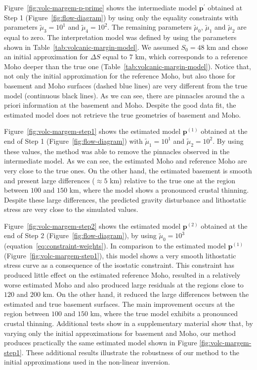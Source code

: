 \documentclass[manuscript]{geophysics}
\begin{document}
Figure~\ref{fig:volc-margem-p-prime} shows the intermediate model 
$\mathbf{p}^{\prime}$ obtained at Step 1 (Figure~\ref{fig:flow-diagram})
by using only the equality constraints with parameters
$\tilde{\mu}_{3} = 10^{1}$ and $\tilde{\mu}_{4} = 10^{2}$.
The remaining parameters $\tilde{\mu}_{0}$, $\tilde{\mu}_{1}$ and
$\tilde{\mu}_{2}$ are equal to zero.
The interpretation model was defined by using the parameters shown in
Table~\ref{tab:volcanic-margin-model}.
We assumed $S_{0} = 48$ km and chose an initial approximation for $\Delta S$
equal to $7$ km, which corresponds to a reference Moho deeper 
than the true one (Table~\ref{tab:volcanic-margin-model}).
Notice that, not only the initial approximation for the reference Moho,
but also those for basement and Moho surfaces 
(dashed blue lines) are very different from
the true model (continuous black lines).
As we can see, there are pinnacles around the a priori information at the 
basement and Moho.
Despite the good data fit, the estimated model does not retrieve the true geometries 
of basement and Moho.

Figure~\ref{fig:volc-margem-step1} shows the estimated model $\mathbf{p}^{(1)}$ 
obtained at the end of Step 1 (Figure~\ref{fig:flow-diagram}) with
$\tilde{\mu}_{1} = 10^{1}$ and $\tilde{\mu}_{2} = 10^{2}$.
By using these values, the method was able to remove the pinnacles observed in
the intermediate model.
As we can see, the estimated Moho and reference Moho are very close to the true ones.
On the other hand, the estimated basement is smooth and present large differences
($\approx 5$ km) relative to the true one at the region between $100$ and $150$ km,
where the model shows a pronounced crustal thinning.
Despite these large differences, 
the predicted gravity disturbance and lithostatic stress 
are very close to the simulated values.

Figure~\ref{fig:volc-margem-step2} shows the estimated model $\mathbf{p}^{(2)}$ 
obtained at the end of Step 2 (Figure~\ref{fig:flow-diagram}), 
by using $\tilde{\mu}_{0} = 10^{3}$ (equation~\ref{eq:constraint-weights}).
In comparison to the estimated model $\mathbf{p}^{(1)}$ (Figure~\ref{fig:volc-margem-step1}),
this model shows a very smooth lithostatic stress curve as a consequence of the
isostatic constraint. This constraint has produced little effect on the
estimated reference Moho, resulted in a relatively worse estimated Moho and
also produced large residuals at the regions close to $120$ and $200$ km.
On the other hand, it reduced the large differences between the estimated and 
true basement surfaces. The main improvement occurs at the region between  
$100$ and $150$ km, where the true model exhibits a 
pronounced crustal thinning. Additional tests show in a supplementary material
show that, by varying only the initial approximations for basement and Moho,
our method produces practically the same estimated model shown in Figure
\ref{fig:volc-margem-step1}. These additional results illustrate the robustness 
of our method to the initial approximations used in the non-linear inversion.
\end{document}
